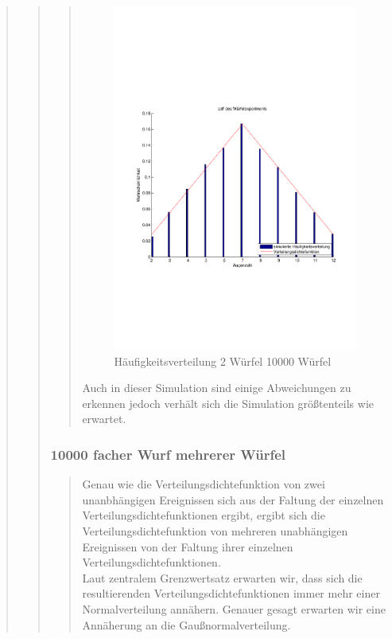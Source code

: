 \begin{quote}
\begin{quote}
\begin{quote}
                \begin{figure}[H] \centering
                    \includegraphics[scale=0.5, trim = 2cm 6.5cm 1.5cm 8.5cm, clip]{./Bilder/2wuerfelpdf}
                        \caption{Häufigkeitsverteilung 2 Würfel 10000 Würfel}
                \end{figure}
            
            Auch in dieser Simulation sind einige Abweichungen zu erkennen jedoch verhält sich die Simulation
            größtenteils wie erwartet.\\       
        \end{quote}
        
        \subsubsection{10000 facher Wurf mehrerer Würfel}
		\begin{quote}
			Genau wie die Verteilungsdichtefunktion von zwei unanbhängigen Ereignissen sich aus der Faltung der einzelnen
			Verteilungsdichtefunktionen ergibt, ergibt sich die Verteilungsdichtefunktion von mehreren unabhängigen Ereignissen
			von der Faltung ihrer einzelnen Verteilungsdichtefunktionen.\\
			Laut zentralem Grenzwertsatz erwarten wir, dass sich die resultierenden
			Verteilungsdichtefunktionen immer mehr einer Normalverteilung annähern. 
			Genauer gesagt erwarten wir eine Annäherung an die Gaußnormalverteilung.


\end{quote}
\end{quote}
\end{quote}
